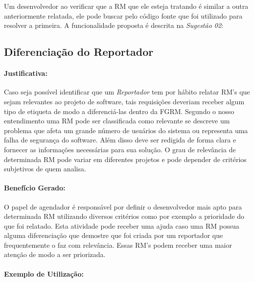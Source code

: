 Um desenvolvedor ao verificar que a RM que ele esteja tratando é similar a outra
anteriormente relatada, ele pode buscar pelo código fonte que foi utilizado para
resolver a primeira. A funcionalidade proposta é descrita na \textit{Sugestão
	02}:


\subsection{Diferenciação do Reportador}
\label{sub:diferenciacao_do_reportdor}


\paragraph{Justificativa:}
\label{par:justificativa_s03}

Caso seja possível identificar que um \textit{Reportador} tem por hábito relatar
RM's que sejam relevantes ao projeto de software, tais requisições deveriam
receber algum tipo de etiqueta de modo a diferenciá-las dentro da FGRM\@.
Segundo o nosso entendimento uma RM pode ser classificada como relevante se
descreve um problema que afeta um grande número de usuários do sistema ou
representa uma falha de segurança do software. Além disso deve ser redigida de
forma clara e fornecer as informações necessárias para sua solução. O grau de
relevância de determinada RM pode variar em diferentes projetos e pode depender
de critérios subjetivos de quem analisa.

\paragraph{Benefício Gerado:}
\label{par:papéis_afetados_s03}

O papel de agendador é responsável por definir o desenvolvedor mais apto
para determinada RM utilizando diversos critérios como por exemplo a prioridade
do que foi relatado. Esta atividade pode receber uma ajuda caso uma RM possua
alguma diferenciação que demostre que foi criada por um reportador que
frequentemente o faz com relevância. Essas RM's podem receber uma maior atenção
de modo a ser priorizada.

\paragraph{Exemplo de Utilização:}
\label{par:exemplo_de_utilização_s03}

